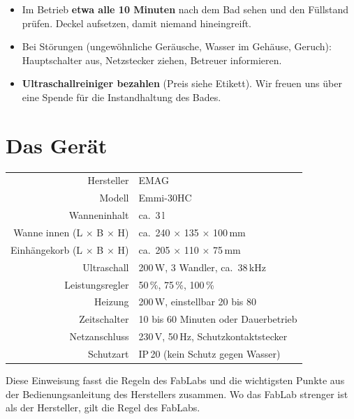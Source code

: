 \documentclass{\basedir/fablab-document}
\begin{document}
	\begin{itemize}
		\item Im Betrieb \textbf{etwa alle 10 Minuten} nach dem Bad sehen und den Füllstand prüfen. Deckel aufsetzen, damit niemand hineingreift.
		\item Bei Störungen (ungewöhnliche Geräusche, Wasser im Gehäuse, Geruch): Hauptschalter aus, Netzstecker ziehen, Betreuer informieren.
		\item \textbf{Ultraschallreiniger bezahlen} (Preis siehe Etikett). Wir freuen uns über eine Spende für die Instandhaltung des Bades.
	\end{itemize}

	\newpage

	\renewcommand{\contentsname}{Inhaltsverzeichnis / Arbeitsablauf}
	\setcounter{tocdepth}{2}
	\tableofcontents
	\newpage

	\section{Das Gerät}

	\begin{center}
		\begin{tabular}{r|l}
			Hersteller & EMAG \\
			Modell & Emmi-30HC \\
			Wanneninhalt & ca.\ 3\,l \\
			Wanne innen (L $\times$ B $\times$ H) & ca.\ 240 $\times$ 135 $\times$ 100\,mm \\
			Einhängekorb (L $\times$ B $\times$ H) & ca.\ 205 $\times$ 110 $\times$ 75\,mm \\
			Ultraschall & 200\,W, 3 Wandler, ca.\ 38\,kHz \\
			Leistungsregler & 50\,\%, 75\,\%, 100\,\% \\
			Heizung & 200\,W, einstellbar 20 bis 80\,\textcelsius \\
			Zeitschalter & 10 bis 60 Minuten oder Dauerbetrieb \\
			Netzanschluss & 230\,V, 50\,Hz, Schutzkontaktstecker \\
			Schutzart & IP\,20 (kein Schutz gegen Wasser) \\
		\end{tabular}
	\end{center}

	Diese Einweisung fasst die Regeln des FabLabs und die wichtigsten Punkte aus der Bedienungsanleitung des Herstellers zusammen. Wo das FabLab strenger ist als der Hersteller, gilt die Regel des FabLabs.
\end{document}
